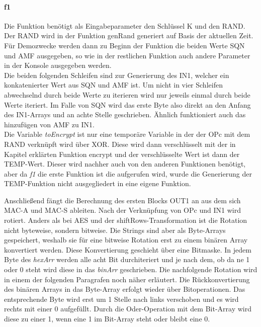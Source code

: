 		\paragraph{f1}
		Die Funktion benötigt als Eingabeparameter den Schlüssel K und den RAND. Der RAND wird in der
		Funktion genRand generiert auf Basis der aktuellen Zeit. \\
		Für Demozwecke werden dann zu Beginn der Funktion die beiden Werte SQN und AMF ausgegeben, so
		wie in der restlichen Funktion auch andere Parameter in der Konsole ausgegeben werden. \\
		Die beiden folgenden Schleifen sind zur Generierung des IN1, welcher ein konkatenierter Wert aus
		SQN und AMF ist. Um nicht in vier Schleifen abwechselnd durch beide Werte zu iterieren wird nur
		jeweils einmal durch beide Werte iteriert. Im Falle von SQN wird das erste Byte also direkt an den
		Anfang des IN1-Arrays und an achte Stelle geschrieben. Ähnlich funktioniert auch das hinzufügen von
		AMF zu IN1. \\
		Die Variable \emph{toEncrypt} ist nur eine temporäre Variable in der der OPc mit dem RAND verknüpft
		wird über XOR. Diese wird dann verschlüsselt mit der in Kapitel  erklärten
		Funktion encrypt und der verschlüsselte Wert ist dann der TEMP-Wert. Dieser wird nachher auch von den
		anderen Funktionen benötigt, aber da \emph{f1} die erste Funktion ist die aufgerufen wird, wurde die
		Generierung der TEMP-Funktion nicht ausgegliedert in eine eigene Funktion.
		
		Anschließend fängt die Berechnung des ersten Blocks OUT1 an aus dem sich MAC-A und MAC-S ableiten. Nach
		der Verknüpfung von OPc und IN1 wird rotiert. Anders als bei AES und der shiftRows-Transformation ist die
		Rotation nicht byteweise, sondern bitweise. Die Strings sind aber als Byte-Arrays gespeichert, weshalb sie
		für eine bitweise Rotation erst zu einem binären Array konvertiert werden. Diese Konvertierung geschieht
		über eine Bitmaske. In jedem Byte des \emph{hexArr} werden alle acht Bit durchiteriert und je nach dem, ob
		da ne 1 oder 0 steht wird diese in das \emph{binArr} geschrieben. Die nachfolgende Rotation wird in einem
		der folgenden Paragrafen noch näher erläutert. Die Rückkonvertierung des binären Arrays in das
		Byte-Array erfolgt wieder über Bitoperationen. Das entsprechende Byte wird erst um 1 Stelle nach links
		verschoben und es wird rechts mit einer 0 aufgefüllt. Durch die Oder-Operation mit dem Bit-Array wird diese
		zu einer 1, wenn eine 1 im Bit-Array steht oder bleibt eine 0.
		
